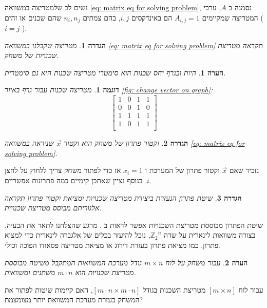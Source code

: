 \documentclass[12pt,leqno]{article}
\theoremstyle{theoremdd}
\newtheorem{definition}{הגדרה}[section]
\newtheorem{example}{דוגמה}[section]
\newtheorem{comm}{הערה}[section]
\newcommand{\Zn}{{\mathbb{Z}_2}^n}
\begin{document}
נשים לב שלמטריצה
במשוואה
\ref{eq: matrix eq for solving problem},
נסמנה 
ב 
$A$,
ערכי המטריצה 
שמקיימים
$A_{i,j} = 1$
הם 
באינדקסים 
$i, j$,
בהם 
צמתים
$n_i, n_j$
שהם שכנים או זהים
(
$i = j$
).
\begin{definition}
    \label{def: neighbor matrix}
    מטריצה 
    שקבלנו במשוואה
    \ref{eq: matrix eq for solving problem}
    תקראה מטריצת שכנויות של משחק.
\end{definition}
\begin{comm}
    \label{comm: symetic matrix}
    היות ובגרף יחס שכנות הוא סימטרי מטריצה שכנות היא גם סימטרית.
\end{comm}
\begin{example}
    מטריצה שכנות עבור גרף באיור 
\ref{fig: change vector on graph}:
\[
    \begin{bmatrix}
        1 & 0 & 1 & 1\\
        0 & 0 & 1 & 0\\
        1 & 1 & 1 & 1\\
        1 & 0 & 1 & 1\\
    \end{bmatrix}
\]
\end{example}
\begin{definition}
    \label{ def: solution vector}
    וקטור פתרון של משחק 
    הוא וקטור
    $\vec{x}$
    שניראה
    במשוואה 
    \ref{eq: matrix eq for solving problem}.
\end{definition}
נזכיר שאם
$\vec{x}$
וקטור פתרון של המערכת 
ו
$x_i = 1$
אז כדי לפתור משחק
צריך ללחוץ על לחצן 
$i$.
בנוסף 
נציין שאתכן קימיים כמה פתרונות אפשריים.
\begin{definition}
    \label{def: standard solution}
    שיטת פתרון הנעזרת ביצירת מטריצה שכנויות 
    ומציאת וקטור פתרון
    תקראה
    אלגוריתם מבוסס מטריצת שכנויות.
\end{definition}
שיטת הפתרון מבוססת מטריצת השכנויות 
אפשר לראות ב
\cite{B2}.
מרגע שהצלחנו לתאר את הבעיה,
בצורה 
משוואות לינארית
על שדה
$\Zn$,
נוכל להיעזר בכלים של אלגברה לינארית
כדי למצוא פתרון,
כמו מציאת פתרון בעזרת דירוג
או
מציאת מטריצה פסאודו הפוכה וכולי. 
\begin{comm}
    \label{comm: for board too many variables}
    עבור משחק על לוח 
    $m \times n$
    גודל מערכת המשוואות המתקבל משיטה 
    מבוססת מטריצת שכנויות 
    הוא 
    $m \cdot n$
    משתנים ומשוואות.
\end{comm}
עבור לוח 
$[ m \times n ]$
מטריצת השכנות בגודל 
$[ m \cdot n \times m \cdot n ]$,
האם קיימות שיטות לפתור את המשחק בעזרת מערכת המשוואת
יותר מצומצמת?
\end{document}
